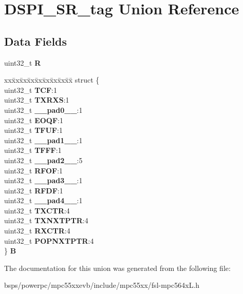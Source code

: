 \hypertarget{unionDSPI__SR__tag}{}\section{D\+S\+P\+I\+\_\+\+S\+R\+\_\+tag Union Reference}
\label{unionDSPI__SR__tag}
\subsection*{Data Fields}
\begin{DoxyCompactItemize}
\item 
\mbox{\label{unionDSPI__SR__tag_a752a00cef22cd99a05e1fc078fe04aad}} 
uint32\+\_\+t {\bfseries R}
\item 
\mbox{\label{unionDSPI__SR__tag_ad30ba70fba7d09dbb1ab692a90f8ea81}} 
\begin{tabbing}
xx\=xx\=xx\=xx\=xx\=xx\=xx\=xx\=xx\=\kill
struct \{\\
\>uint32\_t {\bfseries TCF}:1\\
\>uint32\_t {\bfseries TXRXS}:1\\
\>uint32\_t {\bfseries \_\_pad0\_\_}:1\\
\>uint32\_t {\bfseries EOQF}:1\\
\>uint32\_t {\bfseries TFUF}:1\\
\>uint32\_t {\bfseries \_\_pad1\_\_}:1\\
\>uint32\_t {\bfseries TFFF}:1\\
\>uint32\_t {\bfseries \_\_pad2\_\_}:5\\
\>uint32\_t {\bfseries RFOF}:1\\
\>uint32\_t {\bfseries \_\_pad3\_\_}:1\\
\>uint32\_t {\bfseries RFDF}:1\\
\>uint32\_t {\bfseries \_\_pad4\_\_}:1\\
\>uint32\_t {\bfseries TXCTR}:4\\
\>uint32\_t {\bfseries TXNXTPTR}:4\\
\>uint32\_t {\bfseries RXCTR}:4\\
\>uint32\_t {\bfseries POPNXTPTR}:4\\
\} {\bfseries B}\\

\end{tabbing}\end{DoxyCompactItemize}


The documentation for this union was generated from the following file\+:\begin{DoxyCompactItemize}
\item 
bsps/powerpc/mpc55xxevb/include/mpc55xx/fsl-\/mpc564x\+L.\+h\end{DoxyCompactItemize}
